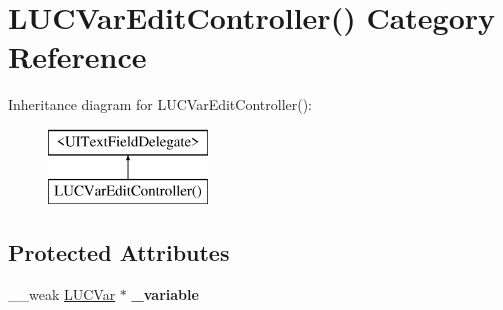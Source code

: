 \hypertarget{category_l_u_c_var_edit_controller_07_08}{}\section{L\+U\+C\+Var\+Edit\+Controller() Category Reference}
\label{category_l_u_c_var_edit_controller_07_08}
Inheritance diagram for L\+U\+C\+Var\+Edit\+Controller()\+:\begin{figure}[H]
\begin{center}
\leavevmode
\includegraphics[height=2.000000cm]{category_l_u_c_var_edit_controller_07_08}
\end{center}
\end{figure}
\subsection*{Protected Attributes}
\begin{DoxyCompactItemize}
\item 
\mbox{\label{category_l_u_c_var_edit_controller_07_08_ac5f306390db18e90e40a0a8cf98ee8a8}} 
\+\_\+\+\_\+weak \mbox{\hyperlink{interface_l_u_c_var}{L\+U\+C\+Var}} $\ast$ {\bfseries \+\_\+variable}
\end{DoxyCompactItemize}
